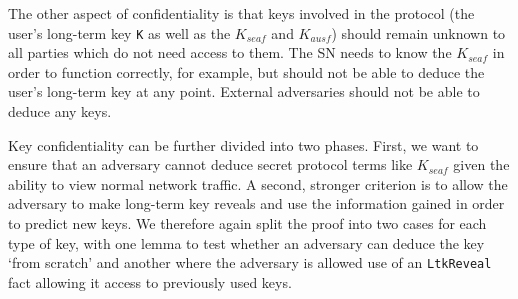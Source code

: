 \documentclass[10pt, pdftex]{article}
\begin{document}
The other aspect of confidentiality is that keys involved in the protocol (the user's long-term key \verb|K| as well as the $K_{seaf}$ and $K_{ausf}$) should remain unknown to all parties which do not need access to them. The SN needs to know the $K_{seaf}$ in order to function correctly, for example, but should not be able to deduce the user's long-term key at any point. External adversaries should not be able to deduce any keys.

Key confidentiality can be further divided into two phases. First, we want to ensure that an adversary cannot deduce secret protocol terms like $K_{seaf}$ given the ability to view normal network traffic. A second, stronger criterion is to allow the adversary to make long-term key reveals and use the information gained in order to predict new keys. We therefore again split the proof into two cases for each type of key, with one lemma to test whether an adversary can deduce the key `from scratch' and another where the adversary is allowed use of an \verb|LtkReveal| fact allowing it access to previously used keys.

%
%
\end{document}
